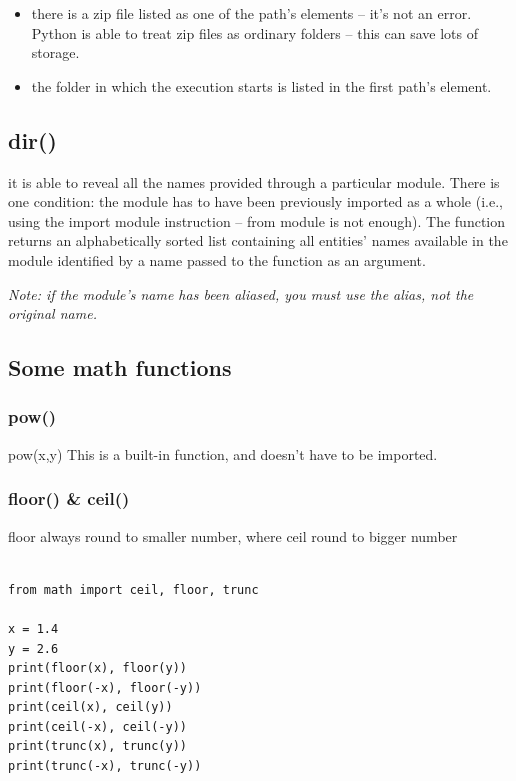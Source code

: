 \documentclass[11pt]{article}
\begin{document}
\begin{itemize}
\item there is a zip file listed as one of the path’s elements – it’s not
an error. Python is able to treat zip files as ordinary folders –
this can save lots of storage.
\item the folder in which the execution starts is listed in the first
path’s element.
\end{itemize}

\subsection{dir()}
\label{sec:org9926c1d}
it is able to reveal all the names provided through a particular
module. There is one condition: the module has to have been previously
imported as a whole (i.e., using the import module instruction – from
module is not enough).  The function returns an alphabetically sorted
list containing all entities’ names available in the module identified
by a name passed to the function as an argument. 

\emph{Note: if the module’s name has been aliased, you must use the alias,
not the original name.}

\subsection{Some math functions}
\label{sec:org229e54b}
\subsubsection{pow()}
\label{sec:org63d52a8}
pow(x,y) This is a built-in function, and doesn’t have to be imported.
\subsubsection{floor() \& ceil()}
\label{sec:org720b0e3}
floor always round to smaller number, where ceil round to bigger number

\begin{verbatim}

from math import ceil, floor, trunc

x = 1.4
y = 2.6
print(floor(x), floor(y))
print(floor(-x), floor(-y))
print(ceil(x), ceil(y))
print(ceil(-x), ceil(-y))
print(trunc(x), trunc(y))
print(trunc(-x), trunc(-y))

\end{verbatim}
\end{document}
